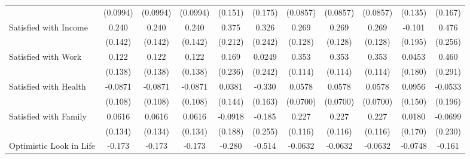 {\begin{tabular}{l*{10}{c}}
            &    (0.0994)         &    (0.0994)         &    (0.0994)         &     (0.151)         &     (0.175)         &    (0.0857)         &    (0.0857)         &    (0.0857)         &     (0.135)         &     (0.167)         \\
\addlinespace
Satisfied with Income&       0.240         &       0.240         &       0.240         &       0.375         &       0.326         &       0.269\sym{*}  &       0.269\sym{*}  &       0.269\sym{*}  &      -0.101         &       0.476         \\
            &     (0.142)         &     (0.142)         &     (0.142)         &     (0.212)         &     (0.242)         &     (0.128)         &     (0.128)         &     (0.128)         &     (0.195)         &     (0.256)         \\
\addlinespace
Satisfied with Work&       0.122         &       0.122         &       0.122         &       0.169         &      0.0249         &       0.353\sym{**} &       0.353\sym{**} &       0.353\sym{**} &      0.0453         &       0.460         \\
            &     (0.138)         &     (0.138)         &     (0.138)         &     (0.236)         &     (0.242)         &     (0.114)         &     (0.114)         &     (0.114)         &     (0.180)         &     (0.291)         \\
\addlinespace
Satisfied with Health&     -0.0871         &     -0.0871         &     -0.0871         &      0.0381         &      -0.330\sym{*}  &      0.0578         &      0.0578         &      0.0578         &      0.0956         &     -0.0533         \\
            &     (0.108)         &     (0.108)         &     (0.108)         &     (0.144)         &     (0.163)         &    (0.0700)         &    (0.0700)         &    (0.0700)         &     (0.150)         &     (0.196)         \\
\addlinespace
Satisfied with Family&      0.0616         &      0.0616         &      0.0616         &     -0.0918         &      -0.185         &       0.227\sym{*}  &       0.227\sym{*}  &       0.227\sym{*}  &      0.0180         &     -0.0699         \\
            &     (0.134)         &     (0.134)         &     (0.134)         &     (0.188)         &     (0.255)         &     (0.116)         &     (0.116)         &     (0.116)         &     (0.170)         &     (0.230)         \\
\addlinespace
Optimistic Look in Life&      -0.173\sym{*}  &      -0.173\sym{*}  &      -0.173\sym{*}  &      -0.280\sym{*}  &      -0.514\sym{***}&     -0.0632         &     -0.0632         &     -0.0632         &     -0.0748         &      -0.161         \\

\end{tabular}}
